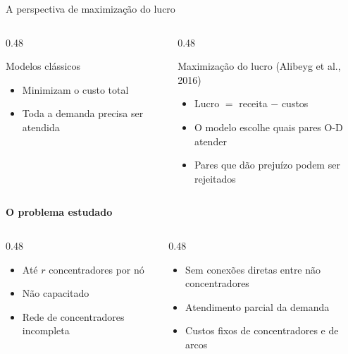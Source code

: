 \documentclass[aspectratio=169, 10pt]{beamer}
\begin{document}
\begin{frame}{A perspectiva de maximização do lucro}
  \begin{columns}[T]
    \begin{column}{0.48\textwidth}
      \begin{block}{Modelos clássicos}
        \begin{itemize}
          \item Minimizam o custo total
          \item Toda a demanda precisa ser atendida
        \end{itemize}
      \end{block}
    \end{column}
    \begin{column}{0.48\textwidth}
      \begin{exampleblock}{Maximização do lucro {\scriptsize(Alibeyg et al., 2016)}}
        \begin{itemize}
          \item Lucro $=$ receita $-$ custos
          \item O modelo \alert{escolhe quais pares O-D atender}
          \item Pares que dão prejuízo podem ser rejeitados
        \end{itemize}
      \end{exampleblock}
    \end{column}
  \end{columns}

  \vspace{0.4cm}
  \textbf{O problema estudado}
  \begin{columns}[T]
    \begin{column}{0.48\textwidth}
      \small
      \begin{itemize}
        \item Até $r$ concentradores por nó
        \item Não capacitado
        \item Rede de concentradores incompleta
      \end{itemize}
    \end{column}
    \begin{column}{0.48\textwidth}
      \small
      \begin{itemize}
        \item Sem conexões diretas entre não concentradores
        \item Atendimento parcial da demanda
        \item Custos fixos de concentradores e de arcos
      \end{itemize}
    \end{column}
  \end{columns}
\end{frame}
\end{document}
